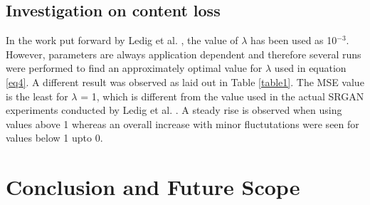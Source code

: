 \documentclass[10pt,journal,compsoc]{IEEEtran}
\begin{document}
\subsection{Investigation on content loss}
In the work put forward by Ledig et al. \cite{ledig2017photo}, the value of $\lambda$ has been used as 10$^{-3}$. However, parameters are always application dependent and therefore several runs were performed to find an approximately optimal value for $\lambda$ used in equation \ref{eq4}. A different result was observed as laid out in Table \ref{table1}. The MSE value is the least for $\lambda$ = 1, which is different from the value used in the actual SRGAN experiments conducted by Ledig et al. \cite{ledig2017photo}. A steady rise is observed when using values above 1 whereas an overall increase with minor fluctutations were seen for values below 1 upto 0. 

\section{Conclusion and Future Scope}







%

\end{document}
